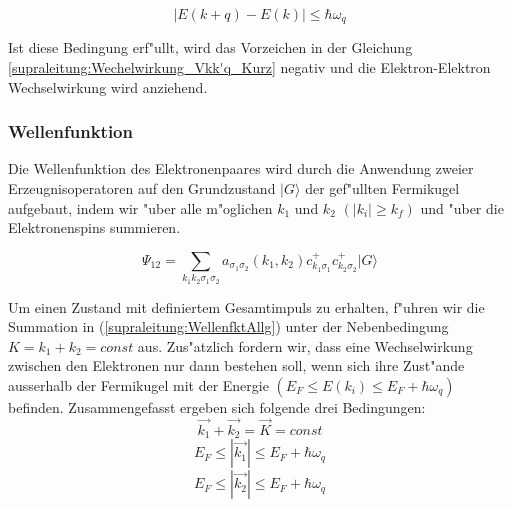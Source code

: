 \begin{refsection}
\begin{equation}
|E(k+q)-E(k)|\le\hbar\omega_q
\label{supraleitung:Phonon Energie}
\end{equation}

Ist diese Bedingung erf"ullt, wird das Vorzeichen in der Gleichung \ref{supraleitung:Wechelwirkung_Vkk'q_Kurz} negativ und die Elektron-Elektron Wechselwirkung wird anziehend.

\subsubsection{Wellenfunktion}
Die Wellenfunktion des Elektronenpaares wird durch die Anwendung zweier Erzeugnisoperatoren auf den Grundzustand $|G\rangle$ der gef"ullten Fermikugel aufgebaut, indem wir "uber alle m"oglichen $k_1$ und $k_2$ $(|k_i| \ge k_f)$ und "uber die Elektronenspins summieren.

\begin{equation}
\Psi_{12}=\sum \limits_{k_1k_2\sigma_1\sigma_2} a_{\sigma_1\sigma_2}(k_1,k_2)c^+_{k_1\sigma_1}c^+_{k_2\sigma_2}|G\rangle
\label{supraleitung:WellenfktAllg}
\end{equation}

Um einen Zustand mit definiertem Gesamtimpuls zu erhalten, f"uhren wir die Summation in (\ref{supraleitung:WellenfktAllg}) unter der Nebenbedingung $K=k_1+k_2=const$ aus. Zus"atzlich fordern wir, dass eine Wechselwirkung zwischen den Elektronen nur dann bestehen soll, wenn sich ihre Zust"ande ausserhalb der Fermikugel mit der Energie $(E_F \le E(k_i) \le E_F+\hbar\omega_q)$ befinden.
Zusammengefasst ergeben sich folgende drei Bedingungen:
\[
\overrightarrow{k_1}+\overrightarrow{k_2}=\overrightarrow{K}=const
\]
\[
E_F\le|\overrightarrow{k_1}|\le E_F+\hbar\omega_q
\]
\[
E_F\le|\overrightarrow{k_2}|\le E_F+\hbar\omega_q
\]

\end{refsection}
